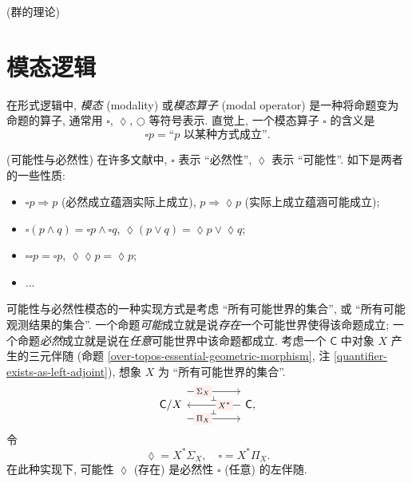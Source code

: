 \begin{example}
	{(群的理论)}
	
\end{example}

\section{模态逻辑}

在形式逻辑中, \emph{模态} (modality) 或\emph{模态算子} (modal operator) 是一种将命题变为命题的算子, 通常用 $\square$, $\lozenge$, $\bigcirc$ 等符号表示. 直觉上, 一个模态算子 $\square$ 的含义是
$$\square p = \text{``$p$ 以某种方式成立''}.$$

\begin{example}
	{(可能性与必然性)}
	在许多文献中, $\square$ 表示 ``必然性'', $\lozenge$ 表示 ``可能性''. 如下是两者的一些性质:
	\begin{itemize}
		\item $\square p \Rightarrow p$ (必然成立蕴涵实际上成立), $p\Rightarrow \lozenge p$ (实际上成立蕴涵可能成立);
		\item $\square (p \land q) = \square p \land \square q$, $\lozenge (p\lor q) = \lozenge p \lor \lozenge q$;
		\item $\square\square p = \square p$, $\lozenge\lozenge p =\lozenge p$;
		\item ...
	\end{itemize}
	可能性与必然性模态的一种实现方式是考虑 ``所有可能世界的集合'', 或 ``所有可能观测结果的集合''. 一个命题\emph{可能}成立就是说\emph{存在}一个可能世界使得该命题成立; 一个命题\emph{必然}成立就是说在\emph{任意}可能世界中该命题都成立.
	考虑一个\topos{} $\mathsf C$ 中对象 $X$ 产生的三元伴随 (命题 \ref{over-topos-essential-geometric-morphism}, 注 \ref{quantifier-exists-as-left-adjoint}),
	想象 $X$ 为 ``所有可能世界的集合''.
	\[\begin{tikzcd}[ampersand replacement=\&,background color=\examplecolor]
		{\mathsf C/X} \&\& {\mathsf C,}
		\arrow[""{name=0, anchor=center, inner sep=0}, "{X^*}"{description, pos=0.3}, from=1-3, to=1-1]
		\arrow[""{name=1, anchor=center, inner sep=0}, "{\Sigma_X}"{description, pos=0.3}, shift left=5, from=1-1, to=1-3]
		\arrow[""{name=2, anchor=center, inner sep=0}, "{\Pi_X}"{description, pos=0.3}, shift right=5, from=1-1, to=1-3]
		\arrow["\dashv"{anchor=center, rotate=-90}, draw=none, from=1, to=0]
		\arrow["\dashv"{anchor=center, rotate=-90}, draw=none, from=0, to=2]
	\end{tikzcd}\]
	令
	$$
	\lozenge = X^*\Sigma_X,\quad
	\square = X^*\Pi_X.
	$$
	在此种实现下, 可能性 $\lozenge$ (存在) 是必然性 $\square$ (任意) 的左伴随.
\end{example}